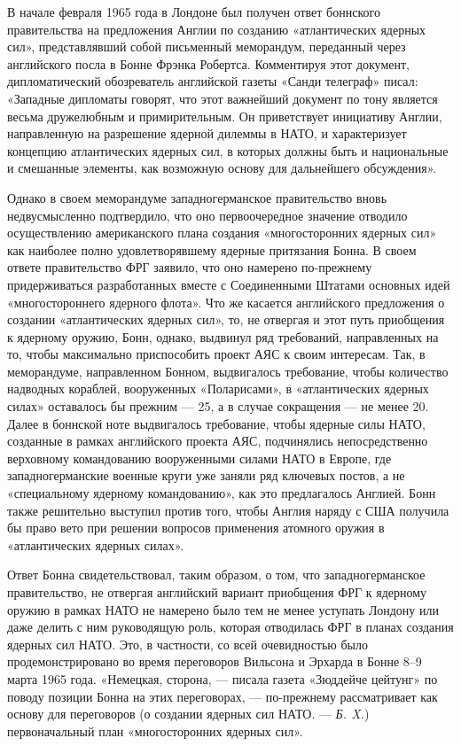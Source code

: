 \documentclass[12pt, a4paper, openany]{book}
\begin{document}
		
В начале февраля 1965 года в Лондоне был получен ответ боннского правительства на предложения Англии по созданию «атлантических ядерных сил», представлявший собой письменный меморандум, переданный через английского посла в Бонне Фрэнка Робертса. Комментируя этот документ, дипломатический обозреватель английской газеты «Санди телеграф» писал: «Западные дипломаты говорят, что этот важнейший документ по тону является весьма дружелюбным и примирительным. Он приветствует инициативу Англии, направленную на разрешение ядерной дилеммы в НАТО, и характеризует концепцию атлантических ядерных сил, в которых должны быть и национальные и смешанные элементы, как возможную основу для дальнейшего обсуждения».
		
Однако в своем меморандуме западногерманское правительство вновь недвусмысленно подтвердило, что оно первоочередное значение отводило осуществлению американского плана создания «многосторонних ядерных сил» как наиболее полно удовлетворявшему ядерные притязания Бонна. В своем ответе правительство ФРГ заявило, что оно намерено по-прежнему придерживаться разработанных вместе с Соединенными Штатами основных идей «многостороннего ядерного флота». Что же касается английского предложения о создании «атлантических ядерных сил», то, не отвергая и этот путь приобщения к ядерному оружию, Бонн, однако, выдвинул ряд требований, направленных на то, чтобы максимально приспособить проект АЯС к своим интересам. Так, в меморандуме, направленном Бонном, выдвигалось требование, чтобы количество надводных кораблей, вооруженных «Поларисами», в «атлантических ядерных силах» оставалось бы прежним — 25, а в случае сокращения — не менее 20. Далее в боннской ноте выдвигалось требование, чтобы ядерные силы НАТО, созданные в рамках английского проекта АЯС, подчинялись непосредственно верховному командованию вооруженными силами НАТО в Европе, где западногерманские военные круги уже заняли ряд ключевых постов, а не «специальному ядерному командованию», как это предлагалось Англией. Бонн также решительно выступил против того, чтобы Англия наряду с США получила бы право вето при решении вопросов применения атомного оружия в «атлантических ядерных силах».
		
Ответ Бонна свидетельствовал, таким образом, о том, что западногерманское правительство, не отвергая английский вариант приобщения ФРГ к ядерному оружию в рамках НАТО не намерено было тем не менее уступать Лондону или даже делить с ним руководящую роль, которая отводилась ФРГ в планах создания ядерных сил НАТО. Это, в частности, со всей очевидностью было продемонстрировано во время переговоров Вильсона и Эрхарда в Бонне 8–9 марта 1965 года. «Немецкая, сторона, — писала газета «Зюддейче цейтунг» по поводу позиции Бонна на этих переговорах, — по-прежнему рассматривает как основу для переговоров (о создании ядерных сил НАТО. — \textit{Б. X.}) первоначальный план «многосторонних ядерных сил».
		
\end{document}
